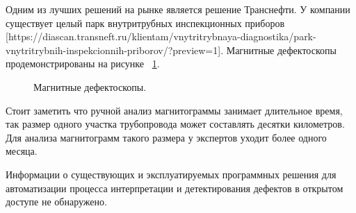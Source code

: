\documentclass[a4paper,article,14pt]{extarticle}
\begin{document}
Одним из лучших решений на рынке является решение Транснефти. У компании существует целый парк внутритрубных инспекционных 
приборов [https://diascan.transneft.ru/klientam/vnytritrybnaya-diagnostika/park-vnytritrybnih-inspekcionnih-priborov/?preview=1]. 
Магнитные дефектоскопы продемонстрированы на рисунке ~\ref{image2}.

\begin{figure}[ht]
    \begin{center}
    
    \caption{
    \label{image2}
    Магнитные дефектоскопы.}
    \end {center}
\end {figure}

Стоит заметить что ручной анализ магнитограммы занимает длительное время, так размер одного участка трубопровода 
может составлять десятки километров. Для анализа магнитограмм такого размера у экспертов уходит более одного месяца.

Информации о существующих и эксплуатируемых программных решения для автоматизации процесса интерпретации и детектирования дефектов в открытом доступе не обнаружено.
\end{document}
